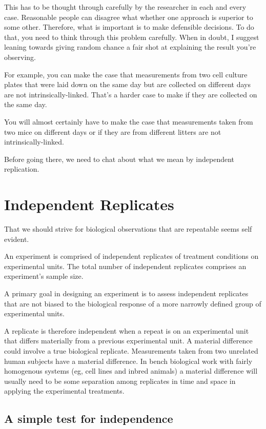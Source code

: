 \documentclass[]{book}
\begin{document}
This has to be thought through carefully by the researcher in each and every case. Reasonable people can disagree what whether one approach is superior to some other. Therefore, what is important is to make defensible decisions. To do that, you need to think through this problem carefully. When in doubt, I suggest leaning towards giving random chance a fair shot at explaining the result you're observing.

For example, you can make the case that measurements from two cell culture plates that were laid down on the same day but are collected on different days are not intrinsically-linked. That's a harder case to make if they are collected on the same day.

You will almost certainly have to make the case that measurements taken from two mice on different days or if they are from different litters are not intrinsically-linked.

Before going there, we need to chat about what we mean by independent replication.

\hypertarget{independent-replicates}{%
\section{Independent Replicates}\label{independent-replicates}}

That we should strive for biological observations that are repeatable seems self evident.

An experiment is comprised of independent replicates of treatment conditions on experimental units. The total number of independent replicates comprises an experiment's sample size.

A primary goal in designing an experiment is to assess independent replicates that are not biased to the biological response of a more narrowly defined group of experimental units.

A replicate is therefore independent when a repeat is on an experimental unit that differs materially from a previous experimental unit. A material difference could involve a true biological replicate. Measurements taken from two unrelated human subjects have a material difference. In bench biological work with fairly homogenous systems (eg, cell lines and inbred animals) a material difference will usually need to be some separation among replicates in time and space in applying the experimental treatments.

\hypertarget{a-simple-test-for-independence}{%
\subsection{A simple test for independence}\label{a-simple-test-for-independence}}
\end{document}
